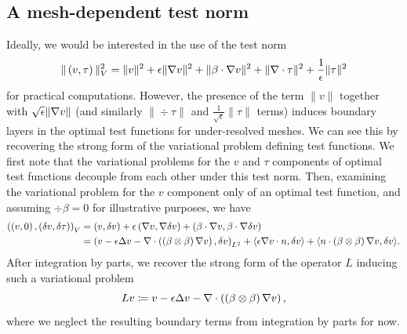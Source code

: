 
\subsection{A mesh-dependent test norm}
Ideally, we would be interested in the use of the test norm 
\[
\|\left(v,\tau\right)\|_{V}^2 = \|v\|^2 + \epsilon \|\grad v\|^2 + \|\beta \cdot \grad v\|^2 + \| \div \tau\|^2 + \frac{1}{\epsilon}\|\tau\|^2
\]
for practical computations. However, the presence of the term $\|v\|$ together with $\sqrt{\epsilon}\|\grad v\|$ (and similarly $\|\div \tau\|$ and $\frac{1}{\sqrt{\epsilon}}\|\tau\|$ terms) induces boundary layers in the optimal test functions for under-resolved meshes. We can see this by recovering the strong form of the variational problem defining test functions. We first note that the variational problems for the $v$ and $\tau$ components of optimal test functions decouple from each other under this test norm. Then, examining the variational problem for the $v$ component only of an optimal test function, and assuming $\div \beta = 0$ for illustrative purposes, we have 
\begin{align*}
\left(\left(v,0\right),\left(\delta v,\delta\tau\right)\right)_{V} &= (v,\delta v) + \epsilon \left(\grad v,\grad \delta v\right) + \left(\beta \cdot \grad v, \beta \cdot \grad \delta v\right)\\
&= \left(v - \epsilon \Delta v - \div \left(\left(\beta \otimes \beta\right) \grad v\right), \delta v\right)_{L^2} + \langle \epsilon \grad v\cdot n, \delta v\rangle + \langle n\cdot \left(\beta\otimes\beta\right) \grad v , \delta v\rangle.
\end{align*}
After integration by parts, we recover the strong form of the operator $L$ inducing such a variational problem 
\[
Lv \coloneqq v - \epsilon \Delta v - \div \left(\left(\beta \otimes \beta\right) \grad v\right),
\]
where we neglect the resulting boundary terms from integration by parts for now. 

